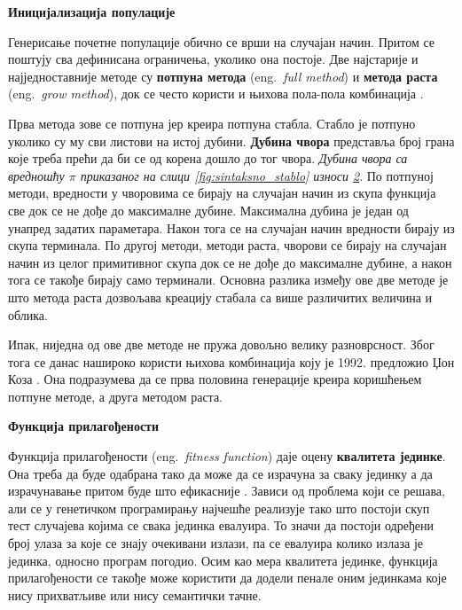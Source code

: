 \documentclass[a4paper]{article}
\begin{document}
\bigskip
\noindent
\textbf{\large Иницијализација популације}\newline

Генерисање почетне популације обично се врши на случајан начин. Притом се поштују сва дефинисана ограничења, уколико она постоје. Две најстарије и најједноставније методе су \textbf{потпуна метода} (eng.~{\em full method}) и \textbf{метода раста} (eng.~{\em grow method}), док се често користи и њихова пола-пола комбинација \cite{fieldGuidetoGP}. \newline

Прва метода зове се потпуна јер креира потпуна стабла. Стабло је потпуно уколико су му сви листови на истој дубини. \textbf{Дубина чвора} представља број грана које треба прећи да би се од корена дошло до тог чвора. \emph{Дубина чвора са вредношћу $\pi$ приказаног на слици \ref{fig:sintaksno_stablo} износи \underline{2}}. По потпуној методи, вредности у чворовима се бирају на случајан начин из скупа функција све док се не дође до максималне дубине. Максимална дубина је један од унапред задатих параметара. Након тога се на случајан начин вредности бирају из скупа терминала. По другој методи, методи раста, чворови се бирају на случајан начин из целог примитивног скупа док се не дође до максималне дубине, а након тога се такође бирају само терминали. Основна разлика између ове две методе је што метода раста дозвољава креацију стабала са више различитих величина и облика.\newline

Ипак, ниједна од ове две методе не пружа довољно велику разноврсност. Због тога се данас нашироко користи њихова комбинација коју је 1992. предложио Џон Коза \cite{koza}. Она подразумева да се прва половина генерације креира коришћењем потпуне методе, а друга методом раста.\newline

\bigskip
\noindent
\textbf{\large Функција прилагођености}\newline 

Функција прилагођености (eng.~{\em fitness function}) даје оцену \textbf{квалитета јединке}. Она треба да буде одабрана тако да може да се израчуна за сваку јединку а да израчунавање притом буде што ефикасније \cite{vi}. Зависи од проблема који се решава, али се у генетичком програмирању најчешће реализује тако што постоји скуп тест случајева којима се свака јединка евалуира. То значи да постоји одређени број улаза за које се знају очекивани излази, па се евалуира колико излаза је јединка, односно програм погодио.
Осим као мера квалитета јединке, функција прилагођености се такође може користити да додели пенале оним јединкама које нису прихватљиве или нису семантички тачне.\newline
\end{document}
